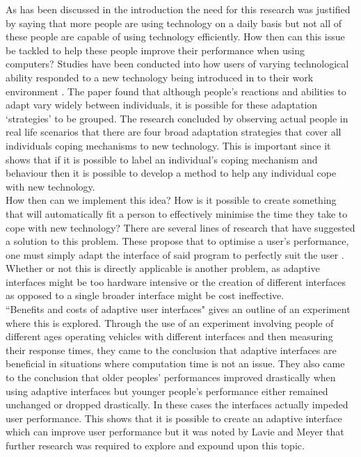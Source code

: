 \documentclass[11pt, conference, compsoc]{IEEEtran}
\begin{document}
As has been discussed in the introduction the need for this research was justified by saying that more people are using technology on a daily basis but not all of these people are capable of using technology efficiently. How then can this issue be tackled to help these people improve their performance when using computers? Studies have been conducted into how users of varying technological ability responded to a new technology being introduced in to their work environment \cite{beaudry2005understanding}. The paper found that although people's reactions and abilities to adapt vary widely between individuals, it is possible for these adaptation `strategies' to be grouped. The research concluded by observing actual people in real life scenarios that there are four broad adaptation strategies that cover all individuals coping mechanisms to new technology. This is important since it shows that if it is possible to label an individual's coping mechanism and behaviour then it is possible to develop a method to help any individual cope with new technology.\\
How then can we implement this idea? How is it possible to create something that will automatically fit a person to effectively minimise the time they take to cope with new technology? There are several lines of research that have suggested a solution to this problem. These propose that to optimise a user's performance, one must simply adapt the interface of said program to perfectly suit the user \cite{lavie2010benefits}. Whether or not this is directly applicable is another problem, as adaptive interfaces might be too hardware intensive or the creation of different interfaces as opposed to a single broader interface might be cost ineffective.\\
``Benefits and costs of adaptive user interfaces"\cite{lavie2010benefits} gives an outline of an experiment where this is explored. Through the use of an experiment involving people of different ages operating vehicles with different interfaces and then measuring their response times,
they came to the conclusion that adaptive interfaces are beneficial in situations where computation time is not an issue. They also came to the conclusion that older peoples' performances improved drastically when using adaptive interfaces but younger people's performance either remained unchanged or dropped drastically. In these cases the interfaces actually impeded user performance.
This shows that it is possible to create an adaptive interface which can improve user performance but it was noted by Lavie and Meyer \cite{lavie2010benefits} that further research was required to explore and expound upon this topic. 
\end{document}
